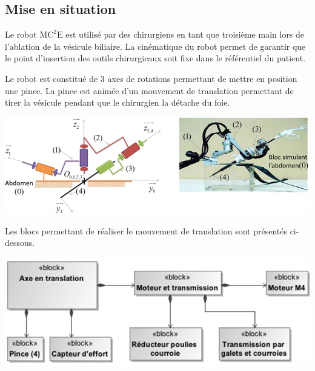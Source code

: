 \documentclass[10pt,fleqn]{article} %
\begin{document}

\vspace{4.5cm}
\pagestyle{fancy}
\thispagestyle{plain}


\def\columnseprulecolor{\color{ocre}}
\setlength{\columnseprule}{0.4pt} 

\ifprof
\else
\begin{multicols}{2}
\fi
\section*{Mise en situation}

\ifprof
\else
Le robot $\text{MC}^2\text{E}$ est utilisé par des chirurgiens en tant que troisième main lors de l'ablation de la vésicule biliaire. La cinématique du robot permet de garantir que le point d'insertion des outils chirurgicaux soit fixe dans le référentiel du patient. 

Le robot est constitué de 3 axes de rotations permettant de mettre en position une pince. La pince est animée d'un mouvement de translation permettant de tirer la vésicule pendant que le chirurgien la détache du foie. 

\begin{center}
\includegraphics[width=\linewidth]{images/fig_02}
\end{center}


Les blocs permettant de réaliser le mouvement de translation sont présentés ci-dessous.


\begin{center}
\includegraphics[width=\linewidth]{images/fig_05}
\end{center}


\end{multicols}
\end{document}
